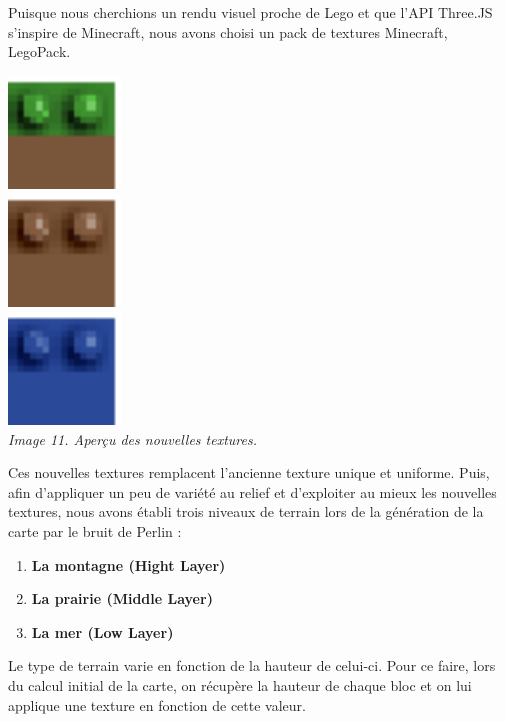 Puisque nous cherchions un rendu visuel proche de Lego et que l'API Three.JS s'inspire de Minecraft, nous avons choisi un pack de textures Minecraft, LegoPack. 
 
\begin{center}
	\includegraphics[height=3cm]{images/grass.eps}\\	\includegraphics[height=3cm]{images/dirt.eps}\\	\includegraphics[height=3cm]{images/water.eps}\\
	\textit{Image 11. Aperçu des nouvelles textures.}\\
\end{center}

Ces nouvelles textures remplacent l'ancienne texture unique et uniforme. Puis, afin d'appliquer un peu de variété au relief et d'exploiter au mieux les nouvelles textures, nous avons établi trois niveaux de terrain lors de la génération de la carte par le bruit de Perlin :
\begin{enumerate}
	\item \textbf{La montagne (Hight Layer)}
	\item \textbf{La prairie (Middle Layer)}
	\item \textbf{La mer (Low Layer)}
\end{enumerate}
Le type de terrain varie en fonction de la hauteur de celui-ci. Pour ce faire, lors du calcul initial de la carte, on récupère la hauteur de chaque bloc et on lui applique une texture en fonction de cette valeur.

